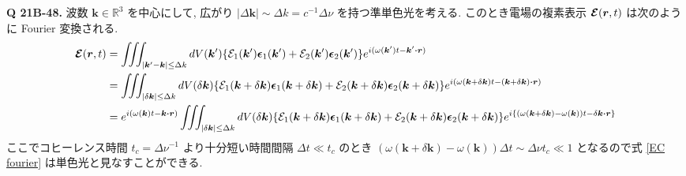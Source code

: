 \documentclass[uplatex,dvipdfmx,a4paper,11pt]{jlreq}
\newcommand{\RR}{\mathbb{R}}
\newcommand{\rr}{\bm{r}}
\newcommand{\kk}{\bm{k}}
\theoremstyle{definition}
\begin{document}
\textbf{Q 21B-48.}
波数 $\kk\in\RR^3$ を中心にして, 広がり $|\Delta\kk|\sim\Delta k = c^{-1}\Delta\nu$ を持つ準単色光を考える. このとき電場の複素表示 $\EC(\rr, t)$ は次のように Fourier 変換される.
\begin{align}
  \EC(\rr, t)
   & = \iiint_{|\kk' - \kk|\leq\Delta k}dV(\kk')\qty{\Ec_1(\kk')\ee_1(\kk') + \Ec_2(\kk')\ee_2(\kk')}e^{\ii(\omega(\kk')t - \kk'\vdot\rr)}                                                                                                                                           \\
   & = \iiint_{|\delta\kk|\leq\Delta k}dV(\delta\kk)\qty{\Ec_1(\kk + \delta\kk)\ee_1(\kk + \delta\kk) + \Ec_2(\kk + \delta\kk)\ee_2(\kk + \delta\kk)}e^{\ii(\omega(\kk + \delta\kk)t - (\kk + \delta\kk)\vdot\rr)}                                                                   \\
   & = e^{\ii(\omega(\kk)t - \kk\vdot\rr)}\iiint_{|\delta\kk|\leq\Delta k}dV(\delta\kk)\qty{\Ec_1(\kk + \delta\kk)\ee_1(\kk + \delta\kk) + \Ec_2(\kk + \delta\kk)\ee_2(\kk + \delta\kk)}e^{\ii\qty{(\omega(\kk + \delta\kk) - \omega(\kk))t - \delta\kk\vdot\rr}} \label{EC fourier} \\
\end{align}
ここでコヒーレンス時間 $t_c = \Delta\nu^{-1}$ より十分短い時間間隔 $\Delta t \ll t_c$ のとき $(\omega(\kk + \delta\kk) - \omega(\kk))\Delta t \sim \Delta\nu t_c \ll 1$ となるので式 \eqref{EC fourier} は単色光と見なすことができる. \\
\end{document}
